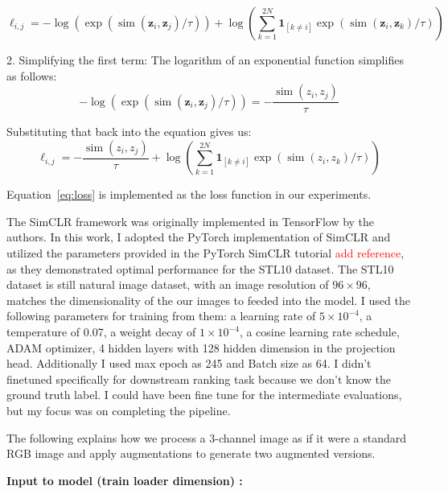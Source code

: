 \[
\ell_{i, j} = -\log \left(\exp \left(\operatorname{sim}\left(\boldsymbol{z}_i, \boldsymbol{z}_j\right) / \tau\right)\right) + \log \left( \sum_{k=1}^{2 N} \mathbf{1}_{[k \neq i]} \exp \left(\operatorname{sim}\left(\boldsymbol{z}_i, \boldsymbol{z}_k\right) / \tau\right) \right)
\]




2. Simplifying the first term: The logarithm of an exponential function simplifies as follows:
\[
-\log\left(\exp\left(\operatorname{sim}\left(\boldsymbol{z}_i, \boldsymbol{z}_j\right) / \tau\right)\right) = -\frac{\operatorname{sim}\left(z_{i}, z_{j}\right)}{\tau}
\]

Substituting that back into the equation gives us:  
\begin{equation}
\ell_{i, j} = -\frac{\operatorname{sim}\left(z_{i}, z_{j}\right)}{\tau} + \log\left(\sum_{k=1}^{2 N} \mathbf{1}_{[k \neq i]} \exp\left(\operatorname{sim}\left(z_{i}, z_{k}\right) / \tau\right)\right)
\label{eq:loss}
\end{equation}

Equation~\ref{eq:loss} is implemented as the loss function in our experiments.

The SimCLR framework was originally implemented in TensorFlow by the authors. In this work, I adopted the PyTorch implementation of SimCLR and utilized the parameters provided in
 the PyTorch SimCLR tutorial \textcolor{red}{add reference}, as they demonstrated optimal performance for the STL10 dataset. The STL10 dataset is still natural image dataset, with 
 an image resolution of \( 96 \times 96 \),  matches the dimensionality of the our images to feeded into the model. I used the following parameters for training from them: a learning 
 rate of \( 5 \times 10^{-4} \), a temperature of 0.07, a weight decay of \( 1 \times 10^{-4} \),
a cosine learning rate schedule, ADAM optimizer, 4 hidden layers with 128 hidden dimension in the projection head. Additionally I used max epoch as 245 and Batch size as 64. I didn't finetuned specifically for
 downstream ranking task because we don't know the ground truth label. I could have been fine tune for the intermediate evaluations, but my focus was on completing the pipeline. 

The following explains how we process a 3-channel image as if it were a standard RGB image and apply augmentations to generate two augmented versions.

\textbf{Input to model (train loader dimension) :} 

